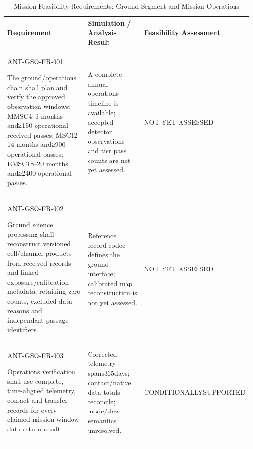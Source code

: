 \begin{table}[H]\centering\small\setlength{\tabcolsep}{3pt}
\caption{Mission Feasibility Requirements: Ground Segment and Mission Operations}\label{tab:fr-gso}
\begin{tabular}{@{}
>{\RaggedRight\arraybackslash}p{}
>{\RaggedRight\arraybackslash}p{}
>{\RaggedRight\arraybackslash}p{}
@{}}
\toprule Requirement & Simulation / Analysis Result & Feasibility Assessment\\\midrule
{}\label{req:ANT-GSO-FR-001}\mbox{ANT-GSO-}\newline\mbox{FR-001}\par The ground/operations chain shall plan and verify the approved observation windows: MMSC4–6 months and≥150 operational received passes; MSC12–14 months and≥900 operational passes; EMSC18–20 months and≥2400 operational passes. & A complete annual operations timeline is available; accepted detector observations and tier pass counts are not yet assessed. & NOT YET ASSESSED\\
\addlinespace[3pt]
\label{req:ANT-GSO-FR-002}\mbox{ANT-GSO-}\newline\mbox{FR-002}\par Ground science processing shall reconstruct versioned cell/channel products from received records and linked exposure/calibration metadata, retaining zero counts, excluded-data reasons and independent-passage identifiers. & Reference record codec defines the ground interface; calibrated map reconstruction is not yet assessed. & NOT YET ASSESSED\\
\addlinespace[3pt]
\label{req:ANT-GSO-FR-003}\mbox{ANT-GSO-}\newline\mbox{FR-003}\par Operations verification shall use complete, time-aligned telemetry, contact and transfer records for every claimed mission-window data-return result. & Corrected telemetry spans365days; contact/native data totals reconcile; mode/slew semantics unresolved. & CONDITIONALLY\newline SUPPORTED\\
\addlinespace[3pt]
\bottomrule
\end{tabular}
\end{table}
